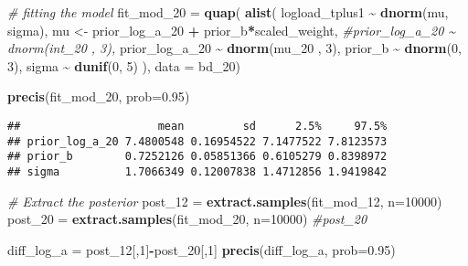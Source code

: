 \documentclass[
]{article}
\newenvironment{Shaded}{\begin{snugshade}}{\end{snugshade}}
\newcommand{\AttributeTok}[1]{\textcolor[rgb]{0.13,0.29,0.53}{#1}}
\newcommand{\CommentTok}[1]{\textcolor[rgb]{0.56,0.35,0.01}{\textit{#1}}}
\newcommand{\DecValTok}[1]{\textcolor[rgb]{0.00,0.00,0.81}{#1}}
\newcommand{\FloatTok}[1]{\textcolor[rgb]{0.00,0.00,0.81}{#1}}
\newcommand{\FunctionTok}[1]{\textcolor[rgb]{0.13,0.29,0.53}{\textbf{#1}}}
\newcommand{\NormalTok}[1]{#1}
\newcommand{\OtherTok}[1]{\textcolor[rgb]{0.56,0.35,0.01}{#1}}
\newcommand{\SpecialCharTok}[1]{\textcolor[rgb]{0.81,0.36,0.00}{\textbf{#1}}}
\begin{document}
\begin{Shaded}
\begin{Highlighting}[]
\CommentTok{\# fitting the model }
\NormalTok{fit\_mod\_20 }\OtherTok{=} \FunctionTok{quap}\NormalTok{(}
             \FunctionTok{alist}\NormalTok{(}
\NormalTok{                logload\_tplus1 }\SpecialCharTok{\textasciitilde{}} \FunctionTok{dnorm}\NormalTok{(mu, sigma),}
\NormalTok{                mu }\OtherTok{\textless{}{-}}\NormalTok{ prior\_log\_a\_20 }\SpecialCharTok{+}\NormalTok{ prior\_b}\SpecialCharTok{*}\NormalTok{scaled\_weight,}
                \CommentTok{\#prior\_log\_a\_20 \textasciitilde{} dnorm(int\_20 , 3),}
\NormalTok{                prior\_log\_a\_20 }\SpecialCharTok{\textasciitilde{}} \FunctionTok{dnorm}\NormalTok{(mu\_20 , }\DecValTok{3}\NormalTok{),}
\NormalTok{                prior\_b }\SpecialCharTok{\textasciitilde{}} \FunctionTok{dnorm}\NormalTok{(}\DecValTok{0}\NormalTok{, }\DecValTok{3}\NormalTok{),}
\NormalTok{                sigma }\SpecialCharTok{\textasciitilde{}} \FunctionTok{dunif}\NormalTok{(}\DecValTok{0}\NormalTok{, }\DecValTok{5}\NormalTok{)}
\NormalTok{             ), }\AttributeTok{data =}\NormalTok{ bd\_20)}

\FunctionTok{precis}\NormalTok{(fit\_mod\_20, }\AttributeTok{prob=}\FloatTok{0.95}\NormalTok{)}
\end{Highlighting}
\end{Shaded}

\begin{verbatim}
##                     mean         sd      2.5%     97.5%
## prior_log_a_20 7.4800548 0.16954522 7.1477522 7.8123573
## prior_b        0.7252126 0.05851366 0.6105279 0.8398972
## sigma          1.7066349 0.12007838 1.4712856 1.9419842
\end{verbatim}

\begin{Shaded}
\begin{Highlighting}[]
\CommentTok{\# Extract the posterior}
\NormalTok{post\_12 }\OtherTok{=} \FunctionTok{extract.samples}\NormalTok{(fit\_mod\_12, }\AttributeTok{n=}\DecValTok{10000}\NormalTok{)}
\NormalTok{post\_20 }\OtherTok{=} \FunctionTok{extract.samples}\NormalTok{(fit\_mod\_20, }\AttributeTok{n=}\DecValTok{10000}\NormalTok{)}
\CommentTok{\#post\_20}

\NormalTok{diff\_log\_a }\OtherTok{=}\NormalTok{ post\_12[,}\DecValTok{1}\NormalTok{]}\SpecialCharTok{{-}}\NormalTok{post\_20[,}\DecValTok{1}\NormalTok{]}
\FunctionTok{precis}\NormalTok{(diff\_log\_a, }\AttributeTok{prob=}\FloatTok{0.95}\NormalTok{)}
\end{Highlighting}
\end{Shaded}
\end{document}
